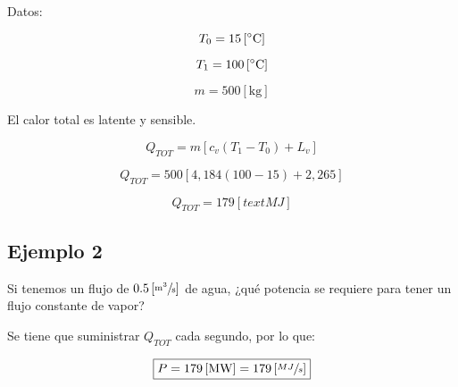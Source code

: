 \documentclass[11pt]{article}
\begin{document}
\bigskip \bigskip

Datos: 

\[ T_0 = 15 \left[ \degree \text{C} \right] \]

\[ T_1 = 100 \left[ \degree \text{C} \right] \]

\[ m = 500 \left[ \text{kg}\right] \]

El calor total es latente y sensible.

\[ Q_{TOT} = m \left[ c_v \left( T_1 - T_0 \right) + L_v \right] \]

\[ Q_{TOT} = 500 \left[ 4,184 \left( 100 - 15 \right) + 2,265 \right] \]

\[ \boxed{ Q_{TOT} = 179 \left[ text{MJ} \right] } \]

\subsection{Ejemplo 2}

Si tenemos un flujo de \( 0.5 \left[ \sfrac{\text{m}^3}{\text{s}} \right] \) de agua, ¿qué potencia se requiere para tener un flujo constante de vapor?

Se tiene que suministrar \( Q_{TOT} \) cada segundo, por lo que:

\[ \boxed{ P = 179 \left[ \text{MW} \right] = 179 \left[ \sfrac{MJ}{s} \right] } \]

\end{document}
